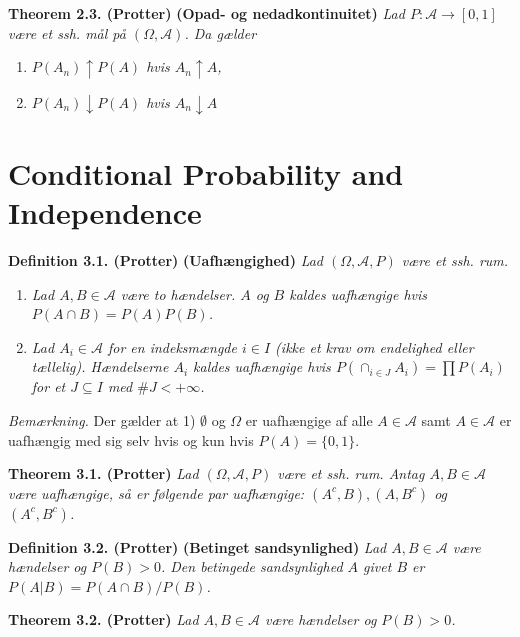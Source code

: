 \documentclass[
]{book}
\providecommand{\tightlist}{%
  \setlength{\itemsep}{0pt}\setlength{\parskip}{0pt}}
\begin{document}
\textbf{Theorem 2.3. (Protter)} \textbf{(Opad- og nedadkontinuitet)} \emph{Lad \(P : \mathcal{A}\to[0,1]\) være et ssh. mål på \((\Omega,\mathcal{A})\). Da gælder}

\begin{enumerate}
\def\labelenumi{\roman{enumi}.}
\setcounter{enumi}{2}
\tightlist
\item
  \emph{\(P(A_n)\uparrow P(A)\) hvis \(A_n\uparrow A\),}
\item
  \emph{\(P(A_n)\downarrow P(A)\) hvis \(A_n\downarrow A\)}
\end{enumerate}

\hypertarget{conditional-probability-and-independence}{%
\section{Conditional Probability and Independence}\label{conditional-probability-and-independence}}

\textbf{Definition 3.1. (Protter)} \textbf{(Uafhængighed)} \emph{Lad \((\Omega,\mathcal{A},P)\) være et ssh. rum.}

\begin{enumerate}
\def\labelenumi{\alph{enumi}.}
\tightlist
\item
  \emph{Lad \(A,B\in\mathcal{A}\) være to hændelser. \(A\) og \(B\) kaldes uafhængige hvis \(P(A\cap B)=P(A)P(B)\).}
\item
  \emph{Lad \(A_i\in\mathcal{A}\) for en indeksmængde \(i\in I\) (ikke et krav om endelighed eller tællelig). Hændelserne \(A_i\) kaldes uafhængige hvis \(P(\cap_{i\in J}A_i)=\prod P(A_i)\) for et \(J\subseteq I\) med \(\# J< +\infty\).}
\end{enumerate}

\emph{Bemærkning.} Der gælder at 1) \(\emptyset\) og \(\Omega\) er uafhængige af alle \(A\in\mathcal{A}\) samt \(A\in\mathcal{A}\) er uafhængig med sig selv hvis og kun hvis \(P(A)=\{0,1\}\).

\textbf{Theorem 3.1. (Protter)} \emph{Lad \((\Omega,\mathcal{A},P)\) være et ssh. rum. Antag \(A,B\in\mathcal{A}\) være uafhængige, så er følgende par uafhængige: \((A^c,B),(A,B^c)\) og \((A^c,B^c)\).}

\textbf{Definition 3.2. (Protter)} \textbf{(Betinget sandsynlighed)} \emph{Lad \(A,B\in\mathcal{A}\) være hændelser og \(P(B)>0\). Den betingede sandsynlighed \(A\) givet \(B\) er \(P(A\vert B)=P(A\cap B)/P(B)\).}

\textbf{Theorem 3.2. (Protter)} \emph{Lad \(A,B\in\mathcal{A}\) være hændelser og \(P(B)>0\).}
\end{document}
